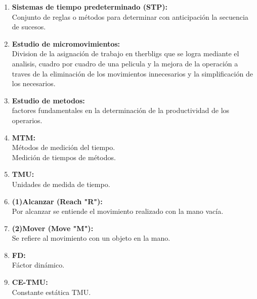 \begin{enumerate}
\item \textbf{Sistemas de tiempo predeterminado (STP): }
    \\ Conjunto de reglas o métodos para determinar con anticipación la secuencia de sucesos.
    \\ \cite{DiapositivasSema-2-21}

\item \textbf{Estudio de micromovimientos: }
    \\Division de la asignación de trabajo en therbligs que se logra mediante el analisis, cuadro por cuadro de una pelicula y la mejora de la operación a traves de la eliminación de los movimientos innecesarios y la simplificación de los necesarios.

\item \textbf{Estudio de metodos: }
    \\factores fundamentales en la determinación de la productividad de los operarios.

\item \textbf{MTM: }
    \\Métodos de medición del tiempo.
    \\Medición de tiempos de métodos.
    \\ \cite{DiapositivasSema-2-22}

\item \textbf{TMU: }
    \\Unidades de medida de tiempo.
    \\ \cite{DiapositivasSema-3-27}

\item \textbf{(1)Alcanzar (Reach "R"): }
    \\Por alcanzar se entiende el movimiento realizado con la mano vacía.
    \\ \cite{DiapositivasSema-3-27}

\item \textbf{(2)Mover (Move "M"): }
    \\Se refiere al movimiento con un objeto en la mano.
    \\ \cite{DiapositivasSema-3-27}

\item \textbf{FD: }
    \\Fáctor dinámico.
    \\ \cite{DiapositivasSema-3-27}

\item \textbf{CE-TMU: }
    \\Constante estática TMU.
    \\ \cite{DiapositivasSema-3-27}


\end{enumerate}
